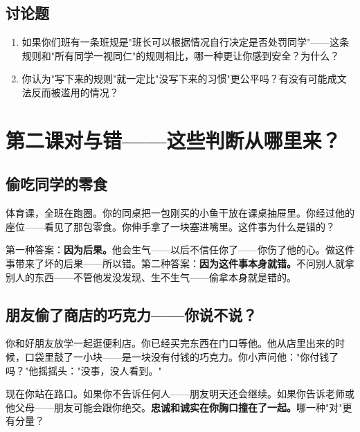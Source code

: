 \documentclass[a4paper,12pt]{ctexart}
\begin{document}
\subsection*{讨论题}
\begin{enumerate}
  \item 如果你们班有一条班规是"班长可以根据情况自行决定是否处罚同学"——这条规则和"所有同学一视同仁"的规则相比，哪一种更让你感到安全？为什么？
  \item 你认为"写下来的规则"就一定比"没写下来的习惯"更公平吗？有没有可能成文法反而被滥用的情况？
\end{enumerate}

\newpage
\section{\textcolor{orange!80!black}{第二课\quad 对与错——这些判断从哪里来？}}

\subsection*{偷吃同学的零食}

体育课，全班在跑圈。你的同桌把一包刚买的小鱼干放在课桌抽屉里。你经过他的座位——看见了那包零食。你伸手拿了一块塞进嘴里。这件事为什么是错的？

第一种答案：\textbf{因为后果。}他会生气——以后不信任你了——你伤了他的心。做这件事带来了坏的后果——所以错。第二种答案：\textbf{因为这件事本身就错。}不问别人就拿别人的东西——不管他发没发现、生不生气——偷拿本身就是错的。

\subsection*{朋友偷了商店的巧克力——你说不说？}

你和好朋友放学一起逛便利店。你已经买完东西在门口等他。他从店里出来的时候，口袋里鼓了一小块——是一块没有付钱的巧克力。你小声问他："你付钱了吗？"他摇摇头："没事，没人看到。"

现在你站在路口。如果你不告诉任何人——朋友明天还会继续。如果你告诉老师或他父母——朋友可能会跟你绝交。\textbf{忠诚和诚实在你胸口撞在了一起。}哪一种"对"更有分量？

\end{document}
